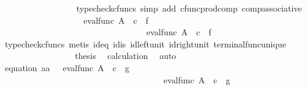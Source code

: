 \begin{isabellebody}
\ \ \ \ \ \ \ \ \ \ \ \ \ \ \ \ \isamarkupfalse%
\ {\isacharparenleft}{\kern0pt}typecheck{\isacharunderscore}{\kern0pt}cfuncs{\isacharcomma}{\kern0pt}\ simp\ add{\isacharcolon}{\kern0pt}\ cfunc{\isacharunderscore}{\kern0pt}prod{\isacharunderscore}{\kern0pt}comp\ comp{\isacharunderscore}{\kern0pt}associative{}{\isacharparenright}{\kern0pt}\isanewline
\ \ \ \ \ \ \ \ \ \ \ \ \ \ \isamarkupfalse%
\ \isamarkupfalse%
\ {\isachardoublequoteopen}{\isachardot}{\kern0pt}{\isachardot}{\kern0pt}{\isachardot}{\kern0pt}\ {\isacharequal}{\kern0pt}\ {\isasymlangle}eval{\isacharunderscore}{\kern0pt}func\ A\ {\isasymOmega}\ {\isasymcirc}\isactrlsub c\ {\isasymlangle}{\isasymt}{\isacharcomma}{\kern0pt}\ f{\isasymrangle}{\isacharcomma}{\kern0pt}\isanewline
\ \ \ \ \ \ \ \ \ \ \ \ \ \ \ \ \ \ \ \ \ \ \ \ \ \ \ \ \ \ \ \ \ \ eval{\isacharunderscore}{\kern0pt}func\ A\ {\isasymOmega}\ {\isasymcirc}\isactrlsub c\ {\isasymlangle}{\isasymf}{\isacharcomma}{\kern0pt}\ f{\isasymrangle}{\isasymrangle}{\isachardoublequoteclose}\ \ \ \ \isanewline
\ \ \ \ \ \ \ \ \ \ \ \ \ \ \ \ \isamarkupfalse%
\ {\isacharparenleft}{\kern0pt}typecheck{\isacharunderscore}{\kern0pt}cfuncs{\isacharcomma}{\kern0pt}\ metis\ id{}{\isacharunderscore}{\kern0pt}eq\ id{}{\isacharunderscore}{\kern0pt}is\ id{\isacharunderscore}{\kern0pt}left{\isacharunderscore}{\kern0pt}unit{}\ id{\isacharunderscore}{\kern0pt}right{\isacharunderscore}{\kern0pt}unit{}\ terminal{\isacharunderscore}{\kern0pt}func{\isacharunderscore}{\kern0pt}unique{\isacharparenright}{\kern0pt}\isanewline
\ \ \ \ \ \ \ \ \ \ \ \ \ \ \isamarkupfalse%
\ \isamarkupfalse%
\ {\isacharquery}{\kern0pt}thesis\ \isamarkupfalse%
\ calculation\ \isamarkupfalse%
\ auto\isanewline
\ \ \ \ \ \ \ \ \ \ \isamarkupfalse%
\isanewline
\ \ \ \ \ \ \ \ \ \ \isamarkupfalse%
\ equation{}{\isacharcolon}{\kern0pt}\ {\isachardoublequoteopen}{\isasymlangle}a{}{\isacharcomma}{\kern0pt}a{}{\isasymrangle}\ {\isacharequal}{\kern0pt}\ \ {\isasymlangle}eval{\isacharunderscore}{\kern0pt}func\ A\ {\isasymOmega}\ {\isasymcirc}\isactrlsub c\ {\isasymlangle}{\isasymt}{\isacharcomma}{\kern0pt}\ g{\isasymrangle}{\isacharcomma}{\kern0pt}\isanewline
\ \ \ \ \ \ \ \ \ \ \ \ \ \ \ \ \ \ \ \ \ \ \ \ \ \ \ \ \ \ \ \ \ \ \ \ \ \ eval{\isacharunderscore}{\kern0pt}func\ A\ {\isasymOmega}\ {\isasymcirc}\isactrlsub c\ {\isasymlangle}{\isasymf}{\isacharcomma}{\kern0pt}\ g{\isasymrangle}{\isasymrangle}{\isachardoublequoteclose}\isanewline

\end{isabellebody}
